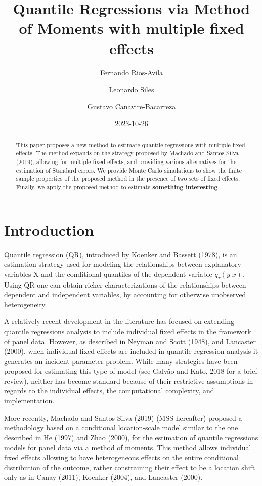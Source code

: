 \documentclass[
  letterpaper,
  DIV=11,
  numbers=noendperiod]{scrartcl}
\title{Quantile Regressions via Method of Moments with multiple fixed
effects}
\author{Fernando Rios-Avila \and Leonardo Siles \and Gustavo
Canavire-Bacarreza}
\date{2023-10-26}
\begin{document}
\maketitle
\begin{abstract}
This paper proposes a new method to estimate quantile regressions with
multiple fixed effects. The method expands on the strategy proposed by
Machado and Santos Silva (2019), allowing for multiple fixed effects,
and providing various alternatives for the estimation of Standard
errors. We provide Monte Carlo simulations to show the finite sample
properties of the proposed method in the presence of two sets of fixed
effects. Finally, we apply the proposed method to estimate
\textbf{something interesting}
\end{abstract}
\ifdefined\Shaded\renewenvironment{Shaded}{\begin{tcolorbox}[sharp corners, enhanced, boxrule=0pt, borderline west={3pt}{0pt}{shadecolor}, frame hidden, interior hidden, breakable]}{\end{tcolorbox}}\fi

\hypertarget{introduction}{%
\section{Introduction}\label{introduction}}

Quantile regression (QR), introduced by Koenker and Bassett (1978), is
an estimation strategy used for modeling the relationships between
explanatory variables X and the conditional quantiles of the dependent
variable \(q_\tau (y|x)\). Using QR one can obtain richer
characterizations of the relationships between dependent and independent
variables, by accounting for otherwise unobserved heterogeneity.

A relatively recent development in the literature has focused on
extending quantile regressions analysis to include individual fixed
effects in the framework of panel data. However, as described in Neyman
and Scott (1948), and Lancaster (2000), when individual fixed effects
are included in quantile regression analysis it generates an incident
parameter problem. While many strategies have been proposed for
estimating this type of model (see Galvão and Kato, 2018 for a brief
review), neither has become standard because of their restrictive
assumptions in regards to the individual effects, the computational
complexity, and implementation.

More recently, Machado and Santos Silva (2019) (MSS hereafter) proposed
a methodology based on a conditional location-scale model similar to the
one described in He (1997) and Zhao (2000), for the estimation of
quantile regressions models for panel data via a method of moments. This
method allows individual fixed effects allowing to have heterogeneous
effects on the entire conditional distribution of the outcome, rather
constraining their effect to be a location shift only as in Canay
(2011), Koenker (2004), and Lancaster (2000).
\end{document}
